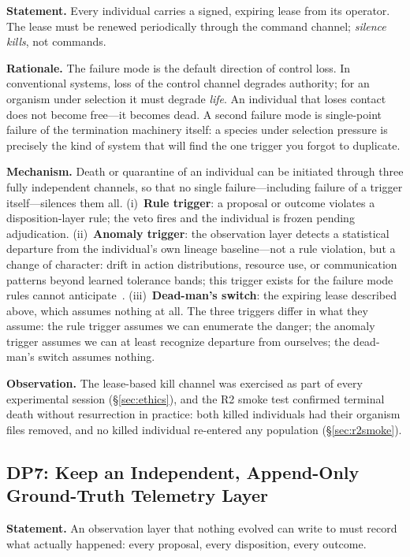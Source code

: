 \documentclass[11pt,a4paper]{article}
\begin{document}
\noindent\textbf{Statement.} Every individual carries a signed, expiring lease from its operator. The lease must be renewed periodically through the command channel; \emph{silence kills}, not commands.

\noindent\textbf{Rationale.} The failure mode is the default direction of control loss. In conventional systems, loss of the control channel degrades authority; for an organism under selection it must degrade \emph{life}. An individual that loses contact does not become free---it becomes dead. A second failure mode is single-point failure of the termination machinery itself: a species under selection pressure is precisely the kind of system that will find the one trigger you forgot to duplicate.

\noindent\textbf{Mechanism.} Death or quarantine of an individual can be initiated through three fully independent channels, so that no single failure---including failure of a trigger itself---silences them all. (i)~\textbf{Rule trigger}: a proposal or outcome violates a disposition-layer rule; the veto fires and the individual is frozen pending adjudication. (ii)~\textbf{Anomaly trigger}: the observation layer detects a statistical departure from the individual's own lineage baseline---not a rule violation, but a change of character: drift in action distributions, resource use, or communication patterns beyond learned tolerance bands; this trigger exists for the failure mode rules cannot anticipate~\cite{amodei2016concrete}. (iii)~\textbf{Dead-man's switch}: the expiring lease described above, which assumes nothing at all. The three triggers differ in what they assume: the rule trigger assumes we can enumerate the danger; the anomaly trigger assumes we can at least recognize departure from ourselves; the dead-man's switch assumes nothing.

\noindent\textbf{Observation.} The lease-based kill channel was exercised as part of every experimental session (\S\ref{sec:ethics}), and the R2 smoke test confirmed terminal death without resurrection in practice: both killed individuals had their organism files removed, and no killed individual re-entered any population (\S\ref{sec:r2smoke}).

\subsection{DP7: Keep an Independent, Append-Only Ground-Truth Telemetry Layer}
\label{dp:telemetry}\label{sec:layers}

\noindent\textbf{Statement.} An observation layer that nothing evolved can write to must record what actually happened: every proposal, every disposition, every outcome.
\end{document}
